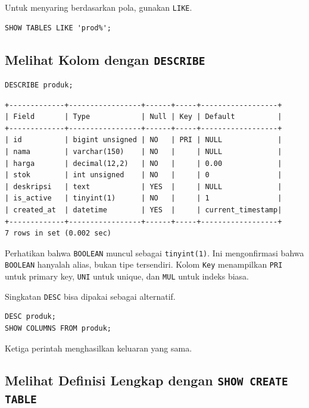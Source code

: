 \documentclass[11pt,a4paper]{article}
\begin{document}
Untuk menyaring berdasarkan pola, gunakan \texttt{LIKE}.

\begin{lstlisting}[style=code]
SHOW TABLES LIKE 'prod%';
\end{lstlisting}

\subsection{Melihat Kolom dengan \texttt{DESCRIBE}}

\begin{lstlisting}[style=code]
DESCRIBE produk;
\end{lstlisting}

\begin{lstlisting}[style=out]
+-------------+-----------------+------+-----+------------------+
| Field       | Type            | Null | Key | Default          |
+-------------+-----------------+------+-----+------------------+
| id          | bigint unsigned | NO   | PRI | NULL             |
| nama        | varchar(150)    | NO   |     | NULL             |
| harga       | decimal(12,2)   | NO   |     | 0.00             |
| stok        | int unsigned    | NO   |     | 0                |
| deskripsi   | text            | YES  |     | NULL             |
| is_active   | tinyint(1)      | NO   |     | 1                |
| created_at  | datetime        | YES  |     | current_timestamp|
+-------------+-----------------+------+-----+------------------+
7 rows in set (0.002 sec)
\end{lstlisting}

Perhatikan bahwa \texttt{BOOLEAN} muncul sebagai \texttt{tinyint(1)}. Ini mengonfirmasi bahwa \texttt{BOOLEAN} hanyalah alias, bukan tipe tersendiri. Kolom \texttt{Key} menampilkan \texttt{PRI} untuk primary key, \texttt{UNI} untuk unique, dan \texttt{MUL} untuk indeks biasa.

Singkatan \texttt{DESC} bisa dipakai sebagai alternatif.

\begin{lstlisting}[style=code]
DESC produk;
SHOW COLUMNS FROM produk;
\end{lstlisting}

Ketiga perintah menghasilkan keluaran yang sama.

\subsection{Melihat Definisi Lengkap dengan \texttt{SHOW CREATE TABLE}}
\end{document}
